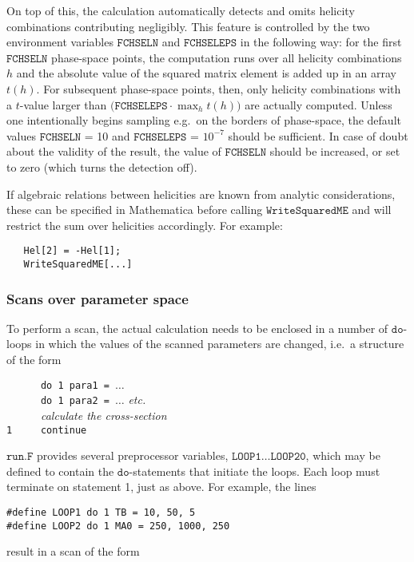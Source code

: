 \documentclass[twoside,11pt]{article}
\def\Code#1{\ensuremath{\texttt{#1}}}
\def\ie{i.e.\ }
\def\eg{e.g.\ }
\begin{document}
On top of this, the calculation automatically detects and omits helicity 
combinations contributing negligibly.  This feature is controlled by the 
two environment variables \Code{FCHSELN} and \Code{FCHSELEPS} in the 
following way: for the first \Code{FCHSELN} phase-space points, the 
computation runs over all helicity combinations $h$ and the absolute 
value of the squared matrix element is added up in an array $t(h)$.  For 
subsequent phase-space points, then, only helicity combinations with a 
$t$-value larger than $\bigl(\Code{FCHSELEPS}\cdot\max_h t(h)\bigr)$ are 
actually computed.  Unless one intentionally begins sampling \eg on the 
borders of phase-space, the default values \Code{FCHSELN} = 10 and 
\Code{FCHSELEPS} = $10^{-7}$ should be sufficient.  In case of doubt 
about the validity of the result, the value of \Code{FCHSELN} should be 
increased, or set to zero (which turns the detection off).

If algebraic relations between helicities are known from analytic 
considerations, these can be specified in Mathematica before calling 
\Code{WriteSquaredME} and will restrict the sum over helicities 
accordingly.  For example:
\begin{verbatim}
   Hel[2] = -Hel[1];
   WriteSquaredME[...]
\end{verbatim}


\subsubsection{Scans over parameter space}%
\label{sect:scans}%
%

To perform a scan, the actual calculation needs to be enclosed in a number
of \Code{do}-loops in which the values of the scanned parameters are
changed, \ie a structure of the form

\medskip
\verb|      do 1 para1 = |$\dots$ \\
\verb|      do 1 para2 = |$\dots$ \textit{etc.} \\
\verb|      |\textit{calculate the cross-section} \\
\verb|1     continue|
\medskip

\Code{run.F} provides several preprocessor variables,
\Code{LOOP1}$\dots$\Code{LOOP20}, which may be defined to contain the
\Code{do}-statements that initiate the loops.  Each loop must terminate
on statement 1, just as above.  For example, the lines
\begin{verbatim}
#define LOOP1 do 1 TB = 10, 50, 5
#define LOOP2 do 1 MA0 = 250, 1000, 250
\end{verbatim}
result in a scan of the form
\end{document}
